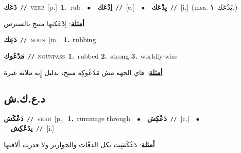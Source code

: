\documentclass[10pt,a4paper,twoside]{article} %
\begin{document}
\begin{multicols}{2}
{\setlength\topsep{0pt}\textbf{\foreignlanguage{arabic}{دَعَك}}\ {\color{gray}\texttt{//}\color{black}}\ \textsc{verb}\ [p.]\ \textbf{1.}~rub\ \ $\bullet$\ \ \setlength\topsep{0pt}\textbf{\foreignlanguage{arabic}{اِدْعَك}}\ {\color{gray}\texttt{//}\color{black}}\ [c.]\ \ $\bullet$\ \ \setlength\topsep{0pt}\textbf{\foreignlanguage{arabic}{يِدْعَك}}\ {\color{gray}\texttt{//}\color{black}}\ [i.]\ \color{gray}(msa. \foreignlanguage{arabic}{يَدْعَك}~\foreignlanguage{arabic}{\textbf{١.}})\color{black}\  \begin{flushright}\color{gray}\foreignlanguage{arabic}{\textbf{\underline{\foreignlanguage{arabic}{أمثلة}}}: اِدْعَكيها منيح بالسترس}\end{flushright}\color{black}} \vspace{2mm}

{\setlength\topsep{0pt}\textbf{\foreignlanguage{arabic}{دَعِك}}\ {\color{gray}\texttt{//}\color{black}}\ \textsc{noun}\ [m.]\ \textbf{1.}~rubbing\ } \vspace{2mm}

{\setlength\topsep{0pt}\textbf{\foreignlanguage{arabic}{مَدْعُوك}}\ {\color{gray}\texttt{//}\color{black}}\ \textsc{noun\textunderscore pass}\ \textbf{1.}~rubbed  \textbf{2.}~strong  \textbf{3.}~worldly-wise\  \begin{flushright}\color{gray}\foreignlanguage{arabic}{\textbf{\underline{\foreignlanguage{arabic}{أمثلة}}}: هاي الجهة مش مَدْعُوكِة منيح، بدليل إِنه ملانة غبرة}\end{flushright}\color{black}} \vspace{2mm}

\vspace{-3mm}
\subsection*{\color{blue}\foreignlanguage{arabic}{د.ع.ك.ش}\color{blue}{}} 

{\setlength\topsep{0pt}\textbf{\foreignlanguage{arabic}{دَعْكَش}}\ {\color{gray}\texttt{//}\color{black}}\ \textsc{verb}\ [p.]\ \textbf{1.}~rummage through\ \ $\bullet$\ \ \setlength\topsep{0pt}\textbf{\foreignlanguage{arabic}{دَعْكِش}}\ {\color{gray}\texttt{//}\color{black}}\ [c.]\ \ $\bullet$\ \ \setlength\topsep{0pt}\textbf{\foreignlanguage{arabic}{يدَعْكِش}}\ {\color{gray}\texttt{//}\color{black}}\ [i.]\  \begin{flushright}\color{gray}\foreignlanguage{arabic}{\textbf{\underline{\foreignlanguage{arabic}{أمثلة}}}: دَعْكَشِت بكل الدفّات والجوارير ولا قدرت ألاقيها}\end{flushright}\color{black}} \vspace{2mm}


\end{multicols}
\end{document}
